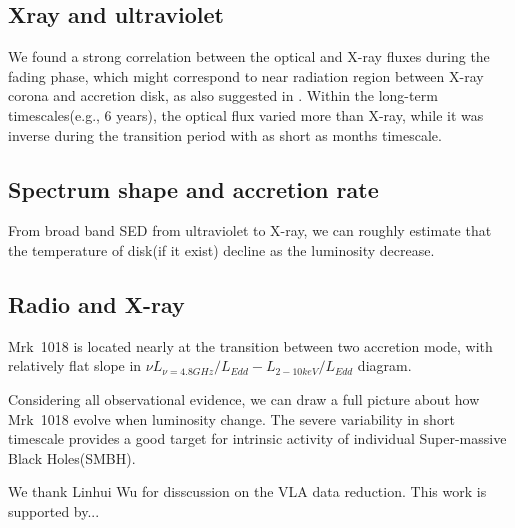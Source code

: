 \documentclass{aastex63}
\begin{document}
\subsection{Xray and ultraviolet }
We found a strong correlation between the optical and X-ray fluxes during the fading phase, which might correspond to near radiation region  between X-ray corona and accretion disk, as also suggested in \citet{2017A&A...607L...9K}. Within the long-term timescales(e.g., 6 years), the optical flux varied more than X-ray, while it was inverse during the transition period with as short as months timescale.



\subsection{Spectrum shape and accretion rate}
From broad band SED from ultraviolet to X-ray, we can roughly estimate that the temperature of disk(if it exist) decline as the luminosity decrease.


\subsection{Radio and X-ray}
Mrk~1018 is located nearly at the transition between two accretion mode, with relatively flat slope in $\nu L_{\nu=4.8GHz}/L_{Edd}-L_{2-10keV}/L_{Edd}$ diagram.


Considering all observational evidence, we can draw a full picture about how Mrk~1018 evolve when luminosity change. The severe variability in short timescale provides a good target for intrinsic activity of individual Super-massive Black Holes(SMBH).



\acknowledgments

We thank Linhui Wu for disscussion on the VLA data reduction. This work is supported by...

%
\end{document}
